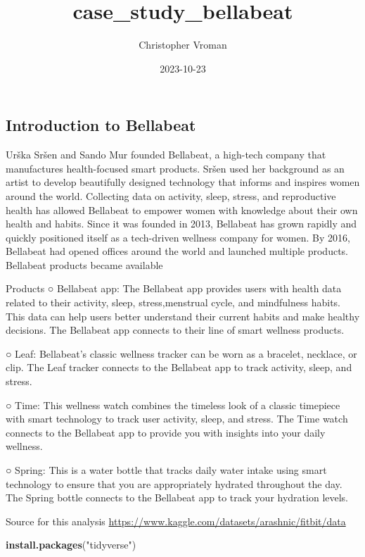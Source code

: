 \documentclass[
]{article}
\title{case\_study\_bellabeat}
\author{Christopher Vroman}
\date{2023-10-23}
\newenvironment{Shaded}{\begin{snugshade}}{\end{snugshade}}
\newcommand{\FunctionTok}[1]{\textcolor[rgb]{0.13,0.29,0.53}{\textbf{#1}}}
\newcommand{\NormalTok}[1]{#1}
\newcommand{\StringTok}[1]{\textcolor[rgb]{0.31,0.60,0.02}{#1}}
\begin{document}
\maketitle

\hypertarget{introduction-to-bellabeat}{%
\subsection{Introduction to Bellabeat}\label{introduction-to-bellabeat}}

Urška Sršen and Sando Mur founded Bellabeat, a high-tech company that
manufactures health-focused smart products. Sršen used her background as
an artist to develop beautifully designed technology that informs and
inspires women around the world. Collecting data on activity, sleep,
stress, and reproductive health has allowed Bellabeat to empower women
with knowledge about their own health and habits. Since it was founded
in 2013, Bellabeat has grown rapidly and quickly positioned itself as a
tech-driven wellness company for women. By 2016, Bellabeat had opened
offices around the world and launched multiple products. Bellabeat
products became available

Products ○ Bellabeat app: The Bellabeat app provides users with health
data related to their activity, sleep, stress,menstrual cycle, and
mindfulness habits. This data can help users better understand their
current habits and make healthy decisions. The Bellabeat app connects to
their line of smart wellness products.

○ Leaf: Bellabeat's classic wellness tracker can be worn as a bracelet,
necklace, or clip. The Leaf tracker connects to the Bellabeat app to
track activity, sleep, and stress.

○ Time: This wellness watch combines the timeless look of a classic
timepiece with smart technology to track user activity, sleep, and
stress. The Time watch connects to the Bellabeat app to provide you with
insights into your daily wellness.

○ Spring: This is a water bottle that tracks daily water intake using
smart technology to ensure that you are appropriately hydrated
throughout the day. The Spring bottle connects to the Bellabeat app to
track your hydration levels.

Source for this analysis
\url{https://www.kaggle.com/datasets/arashnic/fitbit/data}

\begin{Shaded}
\begin{Highlighting}[]
\FunctionTok{install.packages}\NormalTok{(}\StringTok{"tidyverse"}\NormalTok{)}
\end{Highlighting}
\end{Shaded}
\end{document}
